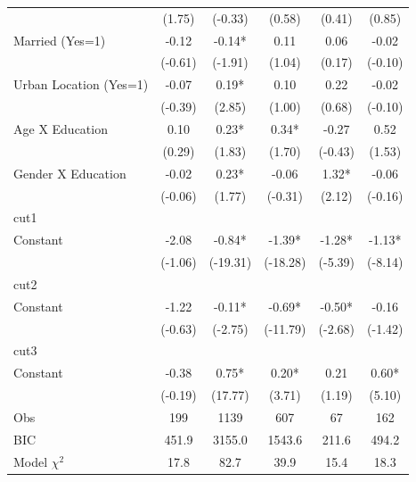{\begin{tabular*}{\hsize}{@{\hskip\tabcolsep\extracolsep\fill}l*{5}{c}}
                    &      (1.75) &     (-0.33) &      (0.58) &      (0.41) &      (0.85) \\
Married (Yes=1)     &       -0.12 &       -0.14*&        0.11 &        0.06 &       -0.02 \\
                    &     (-0.61) &     (-1.91) &      (1.04) &      (0.17) &     (-0.10) \\
Urban Location (Yes=1)&       -0.07 &        0.19*&        0.10 &        0.22 &       -0.02 \\
                    &     (-0.39) &      (2.85) &      (1.00) &      (0.68) &     (-0.10) \\
Age X Education     &        0.10 &        0.23*&        0.34*&       -0.27 &        0.52 \\
                    &      (0.29) &      (1.83) &      (1.70) &     (-0.43) &      (1.53) \\
Gender X Education  &       -0.02 &        0.23*&       -0.06 &        1.32*&       -0.06 \\
                    &     (-0.06) &      (1.77) &     (-0.31) &      (2.12) &     (-0.16) \\
\midrule
cut1                &             &             &             &             &             \\
Constant            &       -2.08 &       -0.84*&       -1.39*&       -1.28*&       -1.13*\\
                    &     (-1.06) &    (-19.31) &    (-18.28) &     (-5.39) &     (-8.14) \\
\midrule
cut2                &             &             &             &             &             \\
Constant            &       -1.22 &       -0.11*&       -0.69*&       -0.50*&       -0.16 \\
                    &     (-0.63) &     (-2.75) &    (-11.79) &     (-2.68) &     (-1.42) \\
\midrule
cut3                &             &             &             &             &             \\
Constant            &       -0.38 &        0.75*&        0.20*&        0.21 &        0.60*\\
                    &     (-0.19) &     (17.77) &      (3.71) &      (1.19) &      (5.10) \\
\midrule
Obs                 &         199 &        1139 &         607 &          67 &         162 \\
BIC                 &       451.9 &      3155.0 &      1543.6 &       211.6 &       494.2 \\
Model $\chi^{2}$    &        17.8 &        82.7 &        39.9 &        15.4 &        18.3 \\
\bottomrule
\end{tabular*}
}
